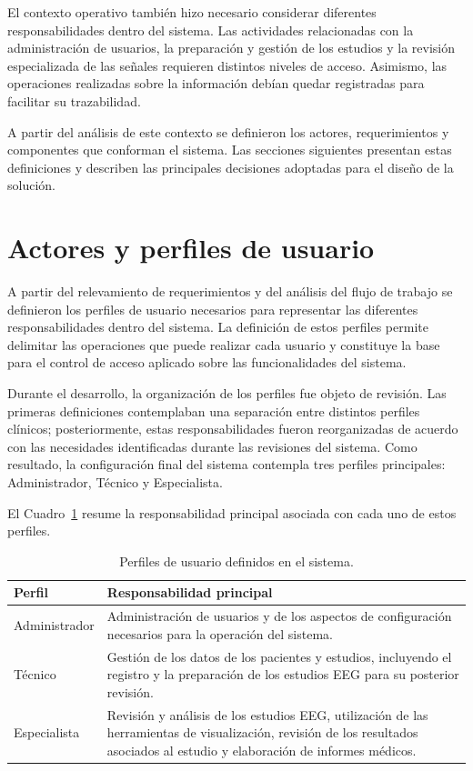 El contexto operativo también hizo necesario considerar diferentes
responsabilidades dentro del sistema. Las actividades relacionadas con la
administración de usuarios, la preparación y gestión de los estudios y la
revisión especializada de las señales requieren distintos niveles de acceso.
Asimismo, las operaciones realizadas sobre la información debían quedar
registradas para facilitar su trazabilidad.

A partir del análisis de este contexto se definieron los actores, requerimientos
y componentes que conforman el sistema. Las secciones siguientes presentan estas
definiciones y describen las principales decisiones adoptadas para el diseño de
la solución.

\section{Actores y perfiles de usuario}
\label{sec:actores-perfiles}

A partir del relevamiento de requerimientos y del análisis del flujo de trabajo
se definieron los perfiles de usuario necesarios para representar las
diferentes responsabilidades dentro del sistema. La definición de estos
perfiles permite delimitar las operaciones que puede realizar cada usuario y
constituye la base para el control de acceso aplicado sobre las funcionalidades
del sistema.

Durante el desarrollo, la organización de los perfiles fue objeto de revisión.
Las primeras definiciones contemplaban una separación entre distintos perfiles
clínicos; posteriormente, estas responsabilidades fueron reorganizadas de
acuerdo con las necesidades identificadas durante las revisiones del sistema.
Como resultado, la configuración final del sistema contempla tres perfiles
principales: Administrador, Técnico y Especialista.

El Cuadro~\ref{tab:perfiles-usuario} resume la responsabilidad principal
asociada con cada uno de estos perfiles.

\begin{table}[H]
    \centering
    \caption{Perfiles de usuario definidos en el sistema.}
    \label{tab:perfiles-usuario}
    \begin{tabular}{|p{}|p{}|}
        \hline
        \textbf{Perfil} & \textbf{Responsabilidad principal} \\
        \hline
        Administrador &
        Administración de usuarios y de los aspectos de configuración
        necesarios para la operación del sistema. \\
        \hline
        Técnico &
        Gestión de los datos de los pacientes y estudios,
        incluyendo el registro y la preparación de los estudios EEG para su
        posterior revisión. \\
        \hline
        Especialista &
        Revisión y análisis de los estudios EEG, utilización de las
        herramientas de visualización, revisión de los resultados asociados
        al estudio y elaboración de informes médicos. \\
        \hline
    \end{tabular}
\end{table}


